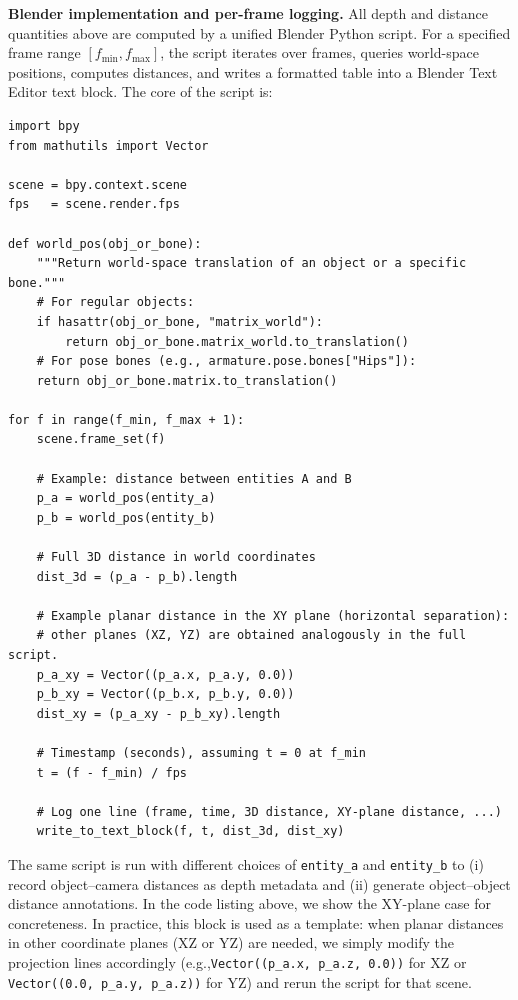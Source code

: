 \noindent\textbf{Blender implementation and per-frame logging.}
All depth and distance quantities above are computed by a unified Blender Python script. For a specified frame range \([f_{\min}, f_{\max}]\), the script iterates over frames, queries world-space positions, computes distances, and writes a formatted table into a Blender Text Editor text block. The core of the script is:
\begin{verbatim}
import bpy
from mathutils import Vector

scene = bpy.context.scene
fps   = scene.render.fps

def world_pos(obj_or_bone):
    """Return world-space translation of an object or a specific bone."""
    # For regular objects:
    if hasattr(obj_or_bone, "matrix_world"):
        return obj_or_bone.matrix_world.to_translation()
    # For pose bones (e.g., armature.pose.bones["Hips"]):
    return obj_or_bone.matrix.to_translation()

for f in range(f_min, f_max + 1):
    scene.frame_set(f)

    # Example: distance between entities A and B
    p_a = world_pos(entity_a)
    p_b = world_pos(entity_b)

    # Full 3D distance in world coordinates
    dist_3d = (p_a - p_b).length

    # Example planar distance in the XY plane (horizontal separation):
    # other planes (XZ, YZ) are obtained analogously in the full script.
    p_a_xy = Vector((p_a.x, p_a.y, 0.0))
    p_b_xy = Vector((p_b.x, p_b.y, 0.0))
    dist_xy = (p_a_xy - p_b_xy).length

    # Timestamp (seconds), assuming t = 0 at f_min
    t = (f - f_min) / fps

    # Log one line (frame, time, 3D distance, XY-plane distance, ...)
    write_to_text_block(f, t, dist_3d, dist_xy)
\end{verbatim}

The same script is run with different choices of \texttt{entity\_a} and \texttt{entity\_b} to (i) record object--camera distances as depth metadata and (ii) generate object--object distance annotations. In the code listing above, we show the XY-plane case for concreteness. In practice, this block is used as a template: when planar distances in other coordinate planes (XZ or YZ) are
needed, we simply modify the projection lines accordingly (e.g.,\texttt{Vector((p\_a.x, p\_a.z, 0.0))} for XZ or
\texttt{Vector((0.0, p\_a.y, p\_a.z))} for YZ) and rerun the script for that scene.

